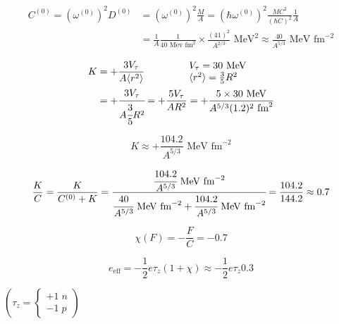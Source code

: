 \documentclass[a4paper,onecolumn,superscriptaddress,12pt,nofootinbib,twoside,raggedfooter,notitlepage]{revtex4-1}
\begin{document}
\begin{align*}
	C^{(0)} = \left( \omega^{(0)} \right)^2 D^{(0)} &= \left( \omega^{(0)} \right)^2 \frac{M}{A} = \left( \hbar \omega^{(0)} \right)^2 \frac{MC^2}{(\hbar C)^2} \frac{1}{A} \\
	&= \frac{1}{A} \frac{1}{40 \textrm{ Mev fm}^2} \times \frac{(41)^2}{A^{2/3}} \textrm{ MeV}^2 \approx \frac{40}{A^{5/3}} \textrm{ MeV fm}^{-2}
\end{align*}

\begin{center}
\end{center}

\begin{align*}
	K &= + \frac{3 V_\tau}{A \langle r^2 \rangle} \qquad \qquad \begin{array}{l} V_\tau = 30 \textrm{ MeV} \\ \langle r^2 \rangle = \frac{3}{5} R^2 \end{array} \\
	&= + \cfrac{3 V_\tau}{A \cfrac{3}{5} R^2} = + \frac{5 V_\tau}{A R^2} = + \frac{5 \times 30 \textrm{ MeV}}{A^{5/3} (1.2)^2 \textrm{ fm}^2}
\end{align*}

$$ K \approx + \frac{104.2}{A^{5/3}} \textrm{ MeV fm}^{-2} $$

$$ \frac{K}{C} = \frac{K}{C^{(0)} + K} = \cfrac{\cfrac{104.2}{A^{5/3}} \textrm{ MeV fm}^{-2}}{\cfrac{40}{A^{5/3}} \textrm{ MeV fm}^{-2} + \cfrac{104.2}{A^{5/3}} \textrm{ MeV fm}^{-2}} = \frac{104.2}{144.2} \approx 0.7$$

$$ \chi(F) = - \frac{F}{C} = -0.7 $$

$$ e_\textrm{eff} = - \frac{1}{2} e \tau_z (1 + \chi) \approx - \frac{1}{2} e \tau_z 0.3 $$

\begin{center}
	 \qquad $ \left( \tau_z = \begin{cases} +1 \; n \\ -1 \; p \end{cases} \right) $
\end{center}
\end{document}
